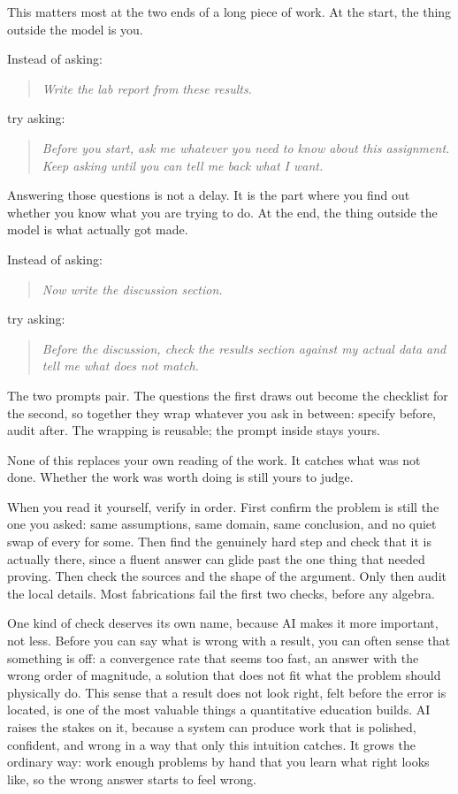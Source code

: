 \documentclass{SIAMbook2023}
\newcommand{\studentprompt}[1]{\begin{quote}\small\itshape #1\end{quote}}
\begin{document}
This matters most at the two ends of a long piece of work. At the start, the thing outside the model is you.

Instead of asking:

\studentprompt{Write the lab report from these results.}

try asking:

\studentprompt{Before you start, ask me whatever you need to know about this assignment. Keep asking until you can tell me back what I want.}

Answering those questions is not a delay. It is the part where you find out whether you know what you are trying to do. At the end, the thing outside the model is what actually got made.

Instead of asking:

\studentprompt{Now write the discussion section.}

try asking:

\studentprompt{Before the discussion, check the results section against my actual data and tell me what does not match.}

The two prompts pair. The questions the first draws out become the checklist for the second, so together they wrap whatever you ask in between: specify before, audit after. The wrapping is reusable; the prompt inside stays yours.

None of this replaces your own reading of the work. It catches what was not done. Whether the work was worth doing is still yours to judge.

When you read it yourself, verify in order. First confirm the problem is still the one you asked: same assumptions, same domain, same conclusion, and no quiet swap of every for some. Then find the genuinely hard step and check that it is actually there, since a fluent answer can glide past the one thing that needed proving. Then check the sources and the shape of the argument. Only then audit the local details. Most fabrications fail the first two checks, before any algebra.

One kind of check deserves its own name, because AI makes it more important, not less. Before you can say what is wrong with a result, you can often sense that something is off: a convergence rate that seems too fast, an answer with the wrong order of magnitude, a solution that does not fit what the problem should physically do. This sense that a result does not look right, felt before the error is located, is one of the most valuable things a quantitative education builds. AI raises the stakes on it, because a system can produce work that is polished, confident, and wrong in a way that only this intuition catches. It grows the ordinary way: work enough problems by hand that you learn what right looks like, so the wrong answer starts to feel wrong.
\end{document}

